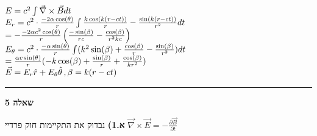 \documentclass[14pt]{extarticle}
\makeatletter
\newenvironment{lefteqs}{%
    \begin{english}%
    \begin{flushleft}%
    \renewcommand{\arraystretch}{1.3}%
    $\begin{array}{@{}l@{}}%
}{%
    \end{array}$%
    \end{flushleft}%
    \end{english}%
}
\makeatother
\begin{document}
\begin{lefteqs}
    E = c^2 \int \vec{\nabla} \times \vec{B} dt \\
    E_r = c^2 \cdot \frac{-2 \alpha \cos(\theta)}{r} \int \frac{k\cos(k(r-ct))}{r} - \frac{\sin(k(r-ct))}{r^2} dt \\
    = -\frac{-2\alpha c^2 \cos(\theta)}{r} \left( \frac{-\sin(\beta)}{rc} - \frac{\cos(\beta)}{r^2 kc} \right) \\
    E_\theta = c^2 \cdot \frac{-\alpha \sin(\theta)}{r} \int (k^2 \sin(\beta) + \frac{\cos(\beta)}{r} - \frac{\sin(\beta)}{r^2}) dt \\
    = \frac{\alpha c \sin(\theta)}{r} (-k\cos(\beta) + \frac{\sin(\beta)}{r} + \frac{\cos(\beta)}{k r^2}) \\
    \vec{E} = E_r \hat{r} + E_\theta \hat{\theta} \, , \beta = k(r-ct)
\end{lefteqs}


\vspace{3em}
\hrule
\vspace{2em}

\textbf{\large שאלה 5}

\textbf{א.1)} 
נבדוק את התקיימות חוק פרדיי $\vec{\nabla} \times \vec{E} = -\frac{\partial \vec{B}}{\partial t}$
\end{document}
